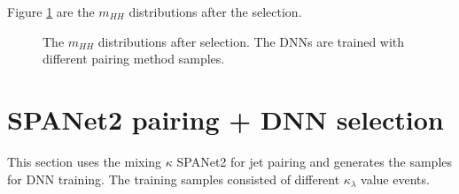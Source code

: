 \documentclass[12pt]{article}
\begin{document}
		Figure \ref{fig:mhh_distributions} are the $m_{HH}$ distributions after the selection.
		\begin{figure}[htpb]
			\centering
			\caption{The $m_{H H}$ distributions after selection. The DNNs are trained with different pairing method samples.}
			\label{fig:mhh_distributions}
		\end{figure}
		
\section{SPANet2 pairing + DNN selection}%
\label{sec:spanet2_pairing_dnn_selection}
	This section uses the mixing $\kappa$ SPANet2 for jet pairing and generates the samples for DNN training. The training samples consisted of different $\kappa_\lambda$ value events.
\end{document}
